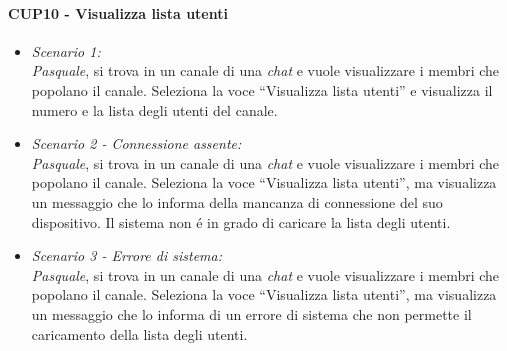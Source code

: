 \paragraph{CUP10 - Visualizza lista utenti\\}
\begin{itemize}
	\item \textit{Scenario 1:\\}
	\textit{Pasquale}, si trova in un canale di una \textit{chat} e vuole visualizzare i membri che popolano il canale. Seleziona la voce “Visualizza lista utenti” e visualizza il numero e la lista degli utenti del canale.\\
	
	\item \textit{Scenario 2 - Connessione assente:\\}
	\textit{Pasquale}, si trova in un canale di una \textit{chat} e vuole visualizzare i membri che popolano il canale. Seleziona la voce “Visualizza lista utenti”, ma visualizza un messaggio che lo informa della mancanza di connessione del suo dispositivo. Il sistema non é in grado di caricare la lista degli utenti.\\
	
	\item \textit{Scenario 3 - Errore di sistema:\\}
	\textit{Pasquale}, si trova in un canale di una \textit{chat} e vuole visualizzare i membri che popolano il canale. Seleziona la voce “Visualizza lista utenti”, ma visualizza un messaggio che lo informa di un errore di sistema che non permette il caricamento della lista degli utenti.\\
\end{itemize}

